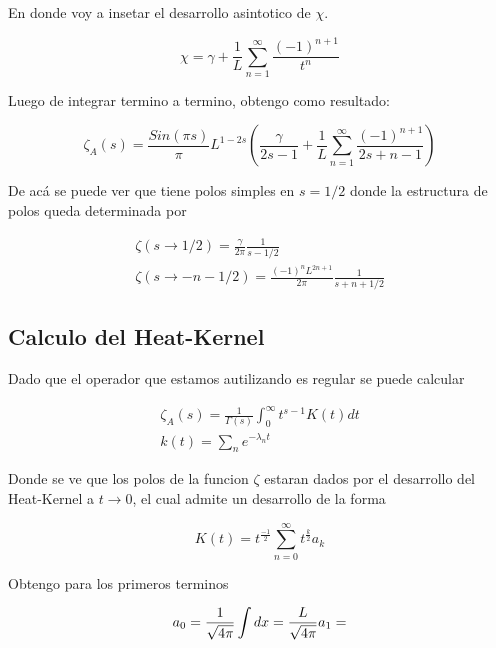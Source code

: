 En donde voy a insetar el desarrollo asintotico de   $\chi$. 

\begin{equation}
    \chi = \gamma + \frac{1}{L} \sum _{n=1} ^{\infty} \frac{(-1) ^{n+1}}{t ^n}
\label{eq:chi}
\end{equation}

Luego de integrar termino a termino, obtengo como resultado:

\begin{equation}
    \zeta _A (s) = 
    \frac{Sin(\pi s)}{\pi} L ^{1-2s}
    \left(
    \frac{\gamma}{2s-1} + 
    \frac{1}{L}
    \sum _{n=1} ^{\infty}
    \frac{(-1) ^{n+1}}{2s+n-1}
    \right)
\label{eq.zeta.com}
\end{equation}

De acá se puede ver que tiene polos simples en $s=1/2$ donde la estructura de polos queda determinada por

\begin{equation}
\begin{array}{c}

\zeta(s \rightarrow 1/2) = \frac{\gamma}{2 \pi} \frac{1}{s-1/2} \\
\zeta (s \rightarrow -n - 1/2)  = \frac{ (-1) ^n L ^{2n+1}  }{2 \pi} \frac{1}{s + n + 1/2}

\end{array}
\end{equation}


\subsection{Calculo del Heat-Kernel}

Dado que el operador que estamos autilizando es regular se puede calcular 

\begin{equation}
\begin{array}{c}
\zeta _A (s) = 
\frac{1}{\Gamma (s)} 
\int _0 ^{\infty}
t ^{s-1}
K(t)
dt \\
k(t) = \sum _{n} e^{- \lambda _n t}
\end{array}
\end{equation}

Donde se ve que los polos de la funcion $\zeta$ estaran dados por el desarrollo del Heat-Kernel a $t \rightarrow 0 $, el cual admite un desarrollo de la forma

\begin{equation}
K (t) = 
t ^{\frac{-1}{2}}
\sum _{n=0} ^{\infty}
t ^{\frac{k}{2}}
a _k
\end{equation}

Obtengo para los primeros terminos

\begin{equation}
a _0 = 
\frac{1}{\sqrt{4 \pi}}
\int dx =
\frac{L}{\sqrt{4 \pi}} \\
a_1 = 
\end{equation}














